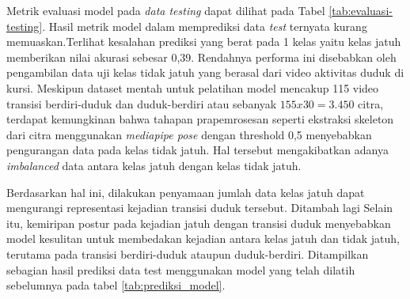Metrik evaluasi model pada \textit{data testing} dapat dilihat pada Tabel \ref{tab:evaluasi-testing}. Hasil metrik model dalam memprediksi data \textit{test} ternyata kurang memuaskan.Terlihat kesalahan prediksi yang berat pada 1 kelas yaitu kelas jatuh memberikan nilai akurasi sebesar 0,39. Rendahnya performa ini disebabkan oleh pengambilan data uji kelas tidak jatuh yang berasal dari video aktivitas duduk di kursi. Meskipun dataset mentah untuk pelatihan model mencakup 115 video transisi berdiri-duduk dan duduk-berdiri atau sebanyak $155 x 30 = 3.450$ citra, terdapat kemungkinan bahwa tahapan prapemrosesan seperti ekstraksi skeleton dari citra menggunakan \textit{mediapipe pose} dengan threshold 0,5 menyebabkan pengurangan data pada kelas tidak jatuh. Hal tersebut mengakibatkan adanya \textit{imbalanced} data antara kelas jatuh dengan kelas tidak jatuh. \par

Berdasarkan hal ini, dilakukan penyamaan jumlah data kelas jatuh dapat mengurangi representasi kejadian transisi duduk tersebut. Ditambah lagi Selain itu, kemiripan postur pada kejadian jatuh dengan transisi duduk menyebabkan model kesulitan untuk membedakan kejadian antara kelas jatuh dan tidak jatuh, terutama pada transisi berdiri-duduk ataupun duduk-berdiri. Ditampilkan sebagian hasil prediksi data test menggunakan model yang telah dilatih sebelumnya pada tabel \ref{tab:prediksi_model}. \par

